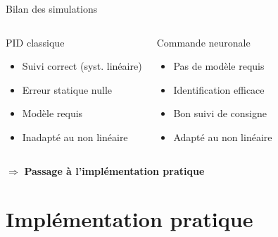 \documentclass[aspectratio=169,12pt]{beamer}
\begin{document}
\begin{frame}{Bilan des simulations}
\begin{columns}[c]
\begin{block}{PID classique}
\begin{itemize}\small
  \item[\checkmark] Suivi correct (syst. linéaire)
  \item[\checkmark] Erreur statique nulle
  \item[$\times$] Modèle requis
  \item[$\times$] Inadapté au non linéaire
\end{itemize}
\end{block}

\begin{exampleblock}{Commande neuronale}
\begin{itemize}\small
  \item[\checkmark] Pas de modèle requis
  \item[\checkmark] Identification efficace
  \item[\checkmark] Bon suivi de consigne
  \item[\checkmark] Adapté au non linéaire
\end{itemize}
\end{exampleblock}
\end{columns}

\vspace{10pt}
\begin{center}
\large $\Rightarrow$ \textbf{Passage à l'implémentation pratique}
\end{center}
\end{frame}

\section{Implémentation pratique}
\end{document}

